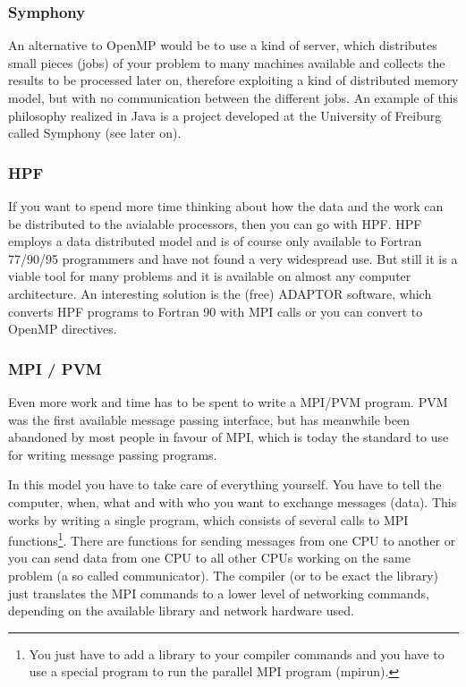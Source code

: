 \subsubsection{Symphony}
An alternative to OpenMP would be to use a kind of server, which distributes
small pieces (jobs) of your problem to many machines available and collects
the results to be processed later on, therefore exploiting a kind of distributed memory
model, but with no communication between the different jobs.
An example of this philosophy
realized in Java is a project developed at the University of Freiburg called
Symphony (see later on). 

\subsubsection{HPF}
If you want to spend more time thinking about how the data and the 
work can be distributed to the avialable processors, then you can go with 
HPF. HPF employs a data distributed model and 
is of course only available to Fortran 77/90/95 programmers and
have not found a very widespread use. But still it is a viable tool for
many problems and it is available on almost any computer architecture.
An interesting solution is the (free) ADAPTOR software, which converts HPF programs
to Fortran 90 with MPI calls or you can convert to OpenMP directives. 

\subsubsection{MPI / PVM}
Even more work and time has to be spent to write a MPI/PVM program. PVM was
the first available message passing interface, but has meanwhile been
abandoned by most people in favour of MPI, which is today the standard to use
for writing message passing programs. 

In this model you have to 
take care of everything yourself. You have to tell the computer, when, what and 
with who you want to exchange messages (data). This works by writing a single
program, which consists of several calls to MPI functions\footnote{You just have
to add a library to your compiler commands and you have to use a special program
to run the parallel MPI program (mpirun).}. There are functions for
sending messages from one CPU to another or you can send data from one CPU to
all other CPUs working on the same problem (a so called communicator).
The compiler (or to be  exact the library) just translates the MPI commands
to a lower level of networking commands, depending on the available library and
network hardware used. 

